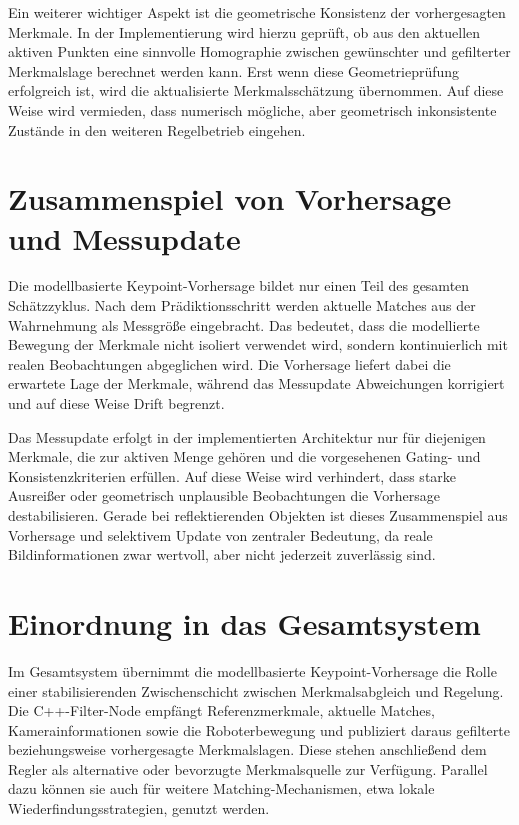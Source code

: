 Ein weiterer wichtiger Aspekt ist die geometrische Konsistenz der vorhergesagten Merkmale. In der Implementierung wird hierzu geprüft, ob aus den aktuellen aktiven Punkten eine sinnvolle Homographie zwischen gewünschter und gefilterter Merkmalslage berechnet werden kann. Erst wenn diese Geometrieprüfung erfolgreich ist, wird die aktualisierte Merkmalsschätzung übernommen. Auf diese Weise wird vermieden, dass numerisch mögliche, aber geometrisch inkonsistente Zustände in den weiteren Regelbetrieb eingehen.

\section{Zusammenspiel von Vorhersage und Messupdate}
\label{sec:zusammenspiel_vorhersage_messupdate}

Die modellbasierte Keypoint-Vorhersage bildet nur einen Teil des gesamten Schätzzyklus. Nach dem Prädiktionsschritt werden aktuelle Matches aus der Wahrnehmung als Messgröße eingebracht. Das bedeutet, dass die modellierte Bewegung der Merkmale nicht isoliert verwendet wird, sondern kontinuierlich mit realen Beobachtungen abgeglichen wird. Die Vorhersage liefert dabei die erwartete Lage der Merkmale, während das Messupdate Abweichungen korrigiert und auf diese Weise Drift begrenzt.

Das Messupdate erfolgt in der implementierten Architektur nur für diejenigen Merkmale, die zur aktiven Menge gehören und die vorgesehenen Gating- und Konsistenzkriterien erfüllen. Auf diese Weise wird verhindert, dass starke Ausreißer oder geometrisch unplausible Beobachtungen die Vorhersage destabilisieren. Gerade bei reflektierenden Objekten ist dieses Zusammenspiel aus Vorhersage und selektivem Update von zentraler Bedeutung, da reale Bildinformationen zwar wertvoll, aber nicht jederzeit zuverlässig sind.

\section{Einordnung in das Gesamtsystem}
\label{sec:einordnung_vorhersage_gesamtsystem}

Im Gesamtsystem übernimmt die modellbasierte Keypoint-Vorhersage die Rolle einer stabilisierenden Zwischenschicht zwischen Merkmalsabgleich und Regelung. Die C++-Filter-Node empfängt Referenzmerkmale, aktuelle Matches, Kamerainformationen sowie die Roboterbewegung und publiziert daraus gefilterte beziehungsweise vorhergesagte Merkmalslagen. Diese stehen anschließend dem Regler als alternative oder bevorzugte Merkmalsquelle zur Verfügung. Parallel dazu können sie auch für weitere Matching-Mechanismen, etwa lokale Wiederfindungsstrategien, genutzt werden.

